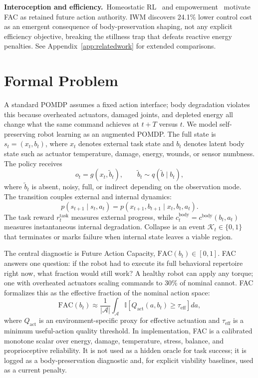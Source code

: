 \documentclass{article}
\newcommand{\fac}{\mathrm{FAC}}
\newcommand{\obs}{o}
\newcommand{\act}{a}
\newcommand{\state}{s}
\newcommand{\ext}{x}
\newcommand{\body}{b}
\newcommand{\bodycost}{c^{\mathrm{body}}}
\newcommand{\task}{r^{\mathrm{task}}}
\newcommand{\collapse}{\mathcal{K}}
\newcommand{\ind}{\mathbb{I}}
\begin{document}
\textbf{Interoception and efficiency.}~Homeostatic RL~\citep{keramati2011homeostatic} and empowerment~\citep{klyubin2005empowerment} motivate FAC as retained future action authority. IWM discovers 24.1\% lower control cost as an emergent consequence of body-preservation shaping, not any explicit efficiency objective, breaking the stillness trap that defeats reactive energy penalties. See Appendix~\ref{app:relatedwork} for extended comparisons.

\section{Formal Problem}
\label{sec:problem}

A standard POMDP assumes a fixed action interface; body degradation violates this because overheated actuators, damaged joints, and depleted energy all change what the same command achieves at $t+T$ versus $t$.
We model self-preserving robot learning as an augmented POMDP.  The full state is $\state_t=(\ext_t,\body_t)$, where $\ext_t$ denotes external task state and $\body_t$ denotes latent body state such as actuator temperature, damage, energy, wounds, or sensor numbness.  The policy receives
\begin{equation}
    \obs_t = g(\ext_t,\tilde{\body}_t),
    \qquad
    \tilde{\body}_t \sim q(\tilde{\body}\mid \body_t),
\end{equation}
where $\tilde{\body}_t$ is absent, noisy, full, or indirect depending on the observation mode.  The transition couples external and internal dynamics:
\begin{equation}
    p(\state_{t+1}\mid \state_t,\act_t)
    =
    p(\ext_{t+1},\body_{t+1}\mid \ext_t,\body_t,\act_t).
\end{equation}
The task reward $\task_t$ measures external progress, while $\bodycost_t = c^{\mathrm{body}}(\body_t,\act_t)$ measures instantaneous internal degradation. Collapse is an event $\collapse_t \in \{0,1\}$ that terminates or marks failure when internal state leaves a viable region.

The central diagnostic is Future Action Capacity, $\fac(\body_t)\in[0,1]$.
FAC answers one question: if the robot had to execute its full behavioral repertoire right now, what fraction would still work?
A healthy robot can apply any torque; one with overheated actuators scaling commands to 30\% of nominal cannot.
FAC formalizes this as the effective fraction of the nominal action space:
\begin{equation}
    \fac(\body_t)
    \approx
    \frac{1}{|\mathcal{A}|}
    \int_{\mathcal{A}}
    \ind\left[Q_{\mathrm{act}}(\act,\body_t) \ge \tau_{\mathrm{eff}}\right] d\act,
\end{equation}
where $Q_{\mathrm{act}}$ is an environment-specific proxy for effective actuation and $\tau_{\mathrm{eff}}$ is a minimum useful-action quality threshold.  In implementation, FAC is a calibrated monotone scalar over energy, damage, temperature, stress, balance, and proprioceptive reliability.  It is not used as a hidden oracle for task success; it is logged as a body-preservation diagnostic and, for explicit viability baselines, used as a current penalty.
\end{document}
